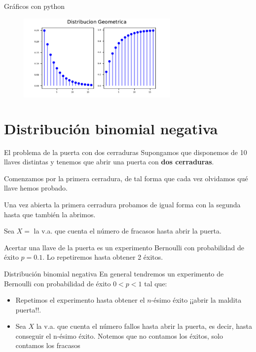 \documentclass[
  ignorenonframetext,
  aspectratio=169]{beamer}
\providecommand{\tightlist}{%
  \setlength{\itemsep}{0pt}\setlength{\parskip}{0pt}}\usepackage{longtable,booktabs,array}
\begin{document}
\begin{frame}{Gráficos con python}
\protect\hypertarget{gruxe1ficos-con-python-1}{}
\begin{figure}

{\centering \includegraphics[width=0.7\textwidth,height=\textheight]{Tema_3_1_Notables_files/figure-beamer/unnamed-chunk-21-15.pdf}

}

\end{figure}
\end{frame}

\hypertarget{distribuciuxf3n-binomial-negativa}{%
\section{Distribución binomial
negativa}\label{distribuciuxf3n-binomial-negativa}}

\begin{frame}{El problema de la puerta con dos cerraduras}
\protect\hypertarget{el-problema-de-la-puerta-con-dos-cerraduras}{}
Supongamos que disponemos de 10 llaves distintas y tenemos que abrir una
puerta con \textbf{dos cerraduras}.

Comenzamos por la primera cerradura, de tal forma que cada vez olvidamos
qué llave hemos probado.

Una vez abierta la primera cerradura probamos de igual forma con la
segunda hasta que también la abrimos.

Sea \(X=\) la v.a. que cuenta el número de fracasos hasta abrir la
puerta.

Acertar una llave de la puerta es un experimento Bernoulli con
probabilidad de éxito \(p=0.1\). Lo repetiremos hasta obtener 2 éxitos.
\end{frame}

\begin{frame}{Distribución binomial negativa}
\protect\hypertarget{distribuciuxf3n-binomial-negativa-1}{}
En general tendremos un experimento de Bernoulli con probabilidad de
éxito \(0<p<1\) tal que:

\begin{itemize}
\tightlist
\item
  Repetimos el experimento hasta obtener el \(n\)-ésimo éxito ¡¡abrir la
  maldita puerta!!.
\item
  Sea \(X\) la v.a. que cuenta el número fallos hasta abrir la puerta,
  es decir, hasta conseguir el n-ésimo éxito. Notemos que no contamos
  los éxitos, solo contamos los fracasos
\end{itemize}
\end{frame}
\end{document}
